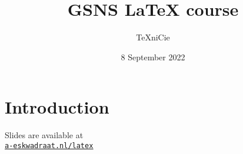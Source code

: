 \documentclass{../../cursuspresentatie}
\title{GSNS \LaTeX{} course}
\author{\TeX niCie}
\date{8 September 2022}
\begin{document}
\section{Introduction}

\begin{frame}
	\titlepage
	\centering

	Slides are available at\\
	\href{http://a-eskwadraat.nl/latex}{\ul{\texttt{a-eskwadraat.nl/latex}}}
\end{frame}

	

% 

% 

% 

% 

% 

% 

%
	
\end{document}
